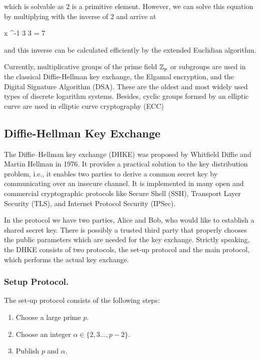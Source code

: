 which is solvable as $2$ is a primitive element. However, we can solve this equation by multiplying with the inverse of $2$ and arrive at

\bee
x ^{-1} 3   3  = 7 
\eee

and this inverse can be calculated efficiently by the extended Euclidian algorithm.

Currently, multiplicative groups of the prime field $\mathbb{Z}_p$ or subgroups are used in the classical Diffie-Hellman key exchange, the Elgamal encryption, and the Digital Signature Algorithm (DSA). These are the oldest and most widely used types of discrete logarithm systems. Besides, cyclic groups formed by an elliptic curve are used in elliptic curve cryptography (ECC)

\subsection{Diffie-Hellman Key Exchange}

The Diffie–Hellman key exchange (DHKE) was proposed by Whitfield Diffie and Martin Hellman in 1976. It provides a practical solution to the key distribution problem, i.e., it enables two parties to derive a common secret key by communicating over an insecure channel. It is implemented in many open and commercial cryptographic protocols like Secure Shell (SSH), Transport Layer Security (TLS), and Internet Protocol Security (IPSec).

In the protocol we have two parties, Alice and Bob, who would like to establish a shared secret key. There is possibly a trusted third party that properly chooses the public parameters which are needed for the key exchange. Strictly speaking, the DHKE consists of two protocols, the set-up protocol and the main protocol, which performs the actual key exchange.

\subsubsection{Setup Protocol.} The set-up protocol consists of the following steps: 

\begin{enumerate}
	\item Choose a large prime $p$.
	\item Choose an integer $\alpha \in \{2,3\ldots, p-2\}$.
	\item Publish $p$ and $\alpha$.
\end{enumerate}

